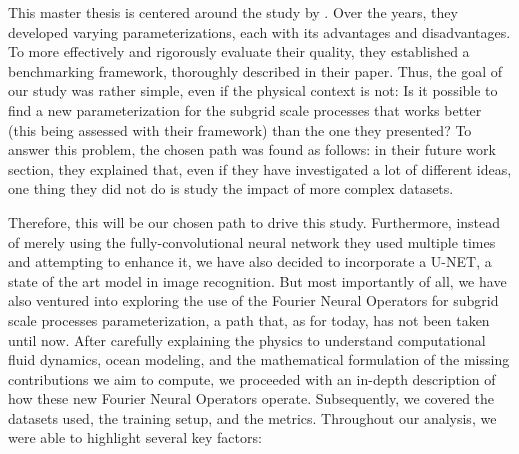 This master thesis is centered around the study by \cite{Benchmarking}. Over the years, they developed varying parameterizations, each with its advantages and disadvantages. To more effectively and rigorously evaluate their quality, they established a benchmarking framework, thoroughly described in their paper. Thus, the goal of our study was rather simple, even if the physical context is not: Is it possible to find a new parameterization for the subgrid scale processes that works better (this being assessed with their framework) than the one they presented? To answer this problem, the chosen path was found as follows: in their future work section, they explained that, even if they have investigated a lot of different ideas, one thing they did not do is study the impact of more complex datasets.

\newpage

Therefore, this will be our chosen path to drive this study. Furthermore, instead of merely using the fully-convolutional neural network they used multiple times and attempting to enhance it, we have also decided to incorporate a U-NET, a state of the art model in image recognition. But most importantly of all, we have also ventured into exploring the use of the Fourier Neural Operators for subgrid scale processes parameterization, a path that, as for today, has not been taken until now. After carefully explaining the physics to understand computational fluid dynamics, ocean modeling, and the mathematical formulation of the missing contributions we aim to compute, we proceeded with an in-depth description of how these new Fourier Neural Operators operate. Subsequently, we covered the datasets used, the training setup, and the metrics. Throughout our analysis, we were able to highlight several key factors:

